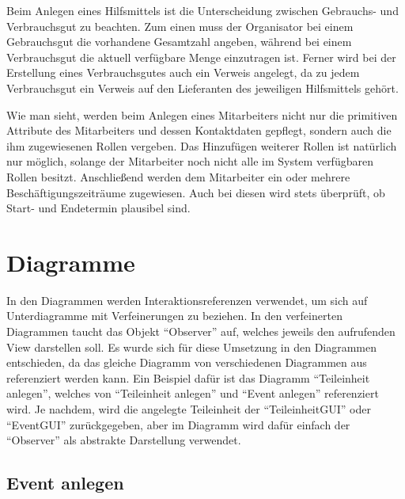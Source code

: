 

Beim Anlegen eines Hilfsmittels ist die Unterscheidung zwischen Gebrauchs- und Verbrauchsgut zu beachten. Zum einen muss der Organisator bei einem Gebrauchsgut die vorhandene Gesamtzahl angeben, während bei einem Verbrauchsgut die aktuell verfügbare Menge einzutragen ist. Ferner wird bei der Erstellung eines Verbrauchsgutes auch ein Verweis angelegt, da zu jedem Verbrauchsgut ein Verweis auf den Lieferanten des jeweiligen Hilfsmittels gehört.



Wie man sieht, werden beim Anlegen eines Mitarbeiters nicht nur die primitiven Attribute des Mitarbeiters und dessen Kontaktdaten gepflegt, sondern auch die ihm zugewiesenen Rollen vergeben. Das Hinzufügen weiterer Rollen ist natürlich nur möglich, solange der Mitarbeiter noch nicht alle im System verfügbaren Rollen besitzt. Anschließend werden dem Mitarbeiter ein oder mehrere Beschäftigungszeiträume zugewiesen. Auch bei diesen wird stets überprüft, ob Start- und Endetermin plausibel sind.

\section{Diagramme}

In den Diagrammen werden Interaktionsreferenzen verwendet, um sich auf Unterdiagramme mit Verfeinerungen zu beziehen. In den verfeinerten Diagrammen taucht das Objekt \enquote{Observer} auf, welches jeweils den aufrufenden View darstellen soll. Es wurde sich für diese Umsetzung in den Diagrammen entschieden, da das gleiche Diagramm von verschiedenen Diagrammen aus referenziert werden kann. Ein Beispiel dafür ist das Diagramm \enquote{Teileinheit anlegen}, welches von \enquote{Teileinheit anlegen} und \enquote{Event anlegen} referenziert wird. Je nachdem, wird die angelegte Teileinheit der \enquote{TeileinheitGUI} oder \enquote{EventGUI} zurückgegeben, aber im Diagramm wird dafür einfach der \enquote{Observer} als abstrakte Darstellung verwendet.

\subsection{Event anlegen}

